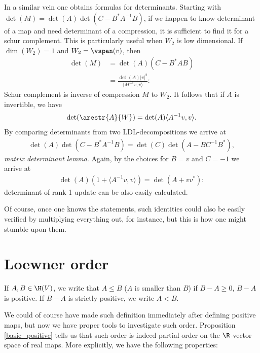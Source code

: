 In a similar vein one obtains formulas for determinants. Starting with $\det(M) = \det(A) \det(C - B^{*} A^{-1} B)$, if we happen to know determinant of a map and need determinant of a compression, it is sufficient to find it for a schur complement. This is particularly useful when $W_{2}$ is low dimensional. If $\dim(W_{2}) = 1$ and $W_{2} = \vspan(v)$, then
\begin{align*}
	\det(M) &= \det(A) \left(C - B^{*} A B\right) \\
	&= \frac{\det(A) |v|^2}{\langle M^{-1} v, v \rangle}:
\end{align*}
Schur complement is inverse of compression $M$ to $W_{2}$. It follows that if $A$ is invertible, we have
\begin{align}\label{compression_determinant}
	\det(\arestr{A}{W}) = \det(A) \langle A^{-1} v, v \rangle.
\end{align}
By comparing determinants from two LDL-decompositions we arrive at
\begin{align}\label{matrix_determinant_lemma}
	\det(A) \det(C - B^{*} A^{-1} B) = \det(C) \det(A - B C^{-1} B^{*}),
\end{align}
\textit{matrix determinant lemma}. Again, by the choices for $B = v$ and $C = -1$ we arrive at
\begin{align*}
	\det(A) \left(1 + \langle A^{-1}v, v\rangle\right) = \det(A + v v^{*}):
\end{align*}
determinant of rank 1 update can be also easily calculated.

Of course, once one knows the statements, such identities could also be easily verified by multiplying everything out, for instance, but this is how one might stumble upon them.

\section{Loewner order}

\begin{maar}
	If $A, B \in \H(V)$, we write that $A \leq B$ ($A$ is smaller than $B$) if $B - A \geq 0$, $B - A$ is positive. If $B - A$ is strictly positive, we write $A < B$.
\end{maar}

We could of course have made such definition immediately after defining positive maps, but now we have proper tools to investigate such order. Proposition \ref{basic_positive} tells us that such order is indeed partial order on the $\R$-vector space of real maps. More explicitly, we have the following properties:


